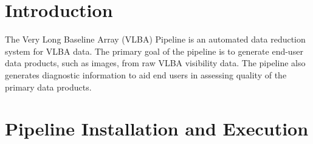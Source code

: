 \documentclass[10pt,onecolumn,final]{IEEEtran}
\begin{document}






%
\IEEEpeerreviewmaketitle



\section{Introduction}
% 
% 
% 
% 

The Very Long Baseline Array (VLBA) Pipeline is an automated data reduction system for VLBA data.  The primary goal of the pipeline is to generate end-user data products, such as images, from raw VLBA visibility data.  The pipeline also generates diagnostic information to aid end users in assessing quality of the primary data products.






\section{Pipeline Installation and Execution}
\end{document}
